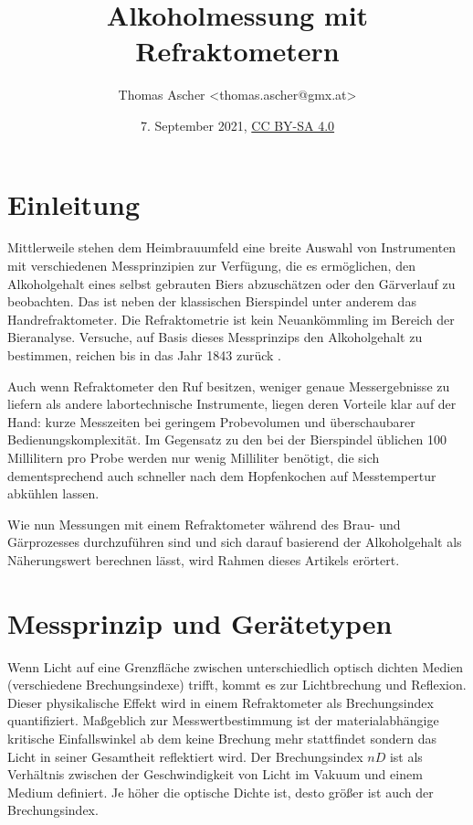 \documentclass[a4paper,parskip=half]{scrartcl}
\title{Alkoholmessung mit Refraktometern}
\author{Thomas Ascher <thomas.ascher@gmx.at>}
\date{7. September 2021, \href{http://creativecommons.org/licenses/by-sa/4.0/}{CC BY-SA 4.0}}
\begin{document}
\maketitle

\section*{Einleitung}

Mittlerweile stehen dem Heimbrauumfeld eine breite Auswahl von Instrumenten
mit verschiedenen Messprinzipien zur Verfügung, die es ermöglichen, den
Alkoholgehalt eines selbst gebrauten Biers abzuschätzen oder den
Gärverlauf zu beobachten. Das ist neben der klassischen Bierspindel
unter anderem das Handrefraktometer. Die Refraktometrie ist
kein Neuankömmling im Bereich der Bieranalyse. Versuche,
auf Basis dieses Messprinzips den Alkoholgehalt zu bestimmen, reichen bis
in das Jahr 1843 zurück \autocite{Gamer1959}.

Auch wenn Refraktometer den Ruf besitzen, weniger genaue Messergebnisse
zu liefern als andere labortechnische Instrumente, liegen deren
Vorteile klar auf der Hand: kurze Messzeiten bei geringem Probevolumen
und überschaubarer Bedienungskomplexität. Im Gegensatz zu den bei der
Bierspindel üblichen 100 Millilitern pro Probe werden nur wenig
Milliliter benötigt, die sich dementsprechend auch schneller nach dem
Hopfenkochen auf Messtempertur abkühlen lassen. \autocite{Bettner1969, Terrill2011}

Wie nun Messungen mit einem Refraktometer während des Brau- und
Gärprozesses durchzuführen sind und sich darauf basierend der
Alkoholgehalt als Näherungswert berechnen lässt, wird
Rahmen dieses Artikels erörtert.

\section*{Messprinzip und Gerätetypen}

Wenn Licht auf eine Grenzfläche zwischen unterschiedlich optisch
dichten Medien (verschiedene Brechungsindexe) trifft,
kommt es zur Lichtbrechung und Reflexion. Dieser physikalische Effekt
wird in einem Refraktometer als Brechungsindex quantifiziert.
Maßgeblich zur Messwertbestimmung ist der materialabhängige
kritische Einfallswinkel ab dem keine Brechung mehr stattfindet
sondern das Licht in seiner Gesamtheit reflektiert wird.
Der Brechungsindex \(\mathit{nD}\) ist als Verhältnis zwischen der
Geschwindigkeit von Licht im Vakuum und einem Medium definiert. Je höher
die optische Dichte ist, desto größer ist auch der Brechungsindex.
\autocite{AKRSSOGH2021,Bonham2001,Gamer1959}
\end{document}
